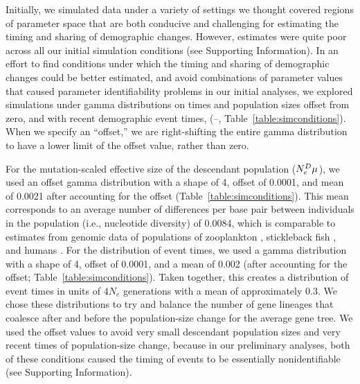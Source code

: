 
Initially, we simulated data under a variety of settings we thought covered
regions of parameter space that are both conducive and challenging for
estimating the timing and sharing of demographic changes.
However, estimates were quite poor across all our initial simulation conditions
(see Supporting Information).
In an effort to find conditions under which the timing and sharing of
demographic changes could be better estimated, and avoid combinations of
parameter values that caused parameter identifiability problems in our initial
analyses,
we explored simulations under gamma distributions on times and population sizes
offset from zero, and with recent demographic event times,
(--, Table~\ref{table:simconditions}).
When we specify an ``offset,'' we are right-shifting the entire gamma distribution to
have a lower limit of the offset value, rather than zero.

For the mutation-scaled effective size of the descendant
population
($\epopsize[\descendantpopindex{}]\murate$),
we used an offset gamma distribution with a shape of 4, offset of 0.0001, and
mean of 0.0021 after accounting for the offset
(Table~\ref{table:simconditions}).
This mean corresponds to an average number of differences per base pair between
individuals in the population (i.e., nucleotide diversity) of 0.0084,
which is comparable to estimates from genomic data
of populations of
zooplankton \citep{Choquet2019},
stickleback fish \citep{Hohenlohe2010},
and humans \citep{Auton2015}.
For the distribution of event times, we used a gamma distribution with a shape
of 4, offset of 0.0001, and a mean of 0.002 (after accounting for the offset;
Table~\ref{table:simconditions}).
Taken together, this creates a distribution of event times in units of
$4N_e$ generations with a mean of approximately 0.3.
We chose these distributions to try and balance the number of gene lineages
that coalesce after and before the population-size change for the average gene
tree.
We used the offset values to avoid very small descendant population sizes and
very recent times of population-size change, because in our preliminary
analyses, both of these conditions caused the timing of events to be
essentially nonidentifiable (see Supporting Information).

